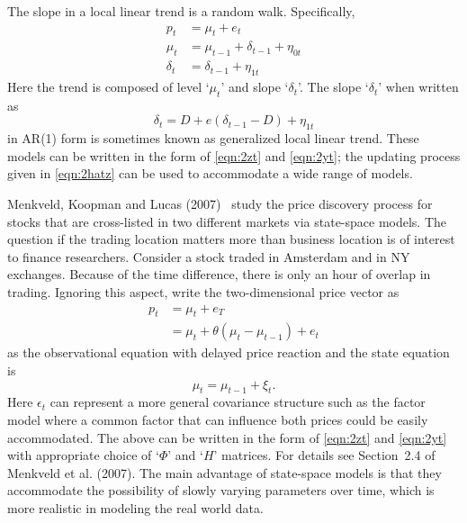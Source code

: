 \begin{ex}
The slope in a local linear trend is a random walk. Specifically,
	\begin{equation} \label{eqn:randomwalk}
	\begin{split}
	p_t&= \mu_t + e_t \\
	\mu_t&= \mu_{t-1} + \delta_{t-1} + \eta_{0t} \\
	\delta_t&= \delta_{t-1} + \eta_{1t}
	\end{split}
	\end{equation}
Here the trend is composed of level `$\mu_t$' and slope `$\delta_t$'. The slope `$\delta_t$' when written as 
	\begin{equation} \label{eqn:slopewritten}
	\delta_t= D+ e(\delta_{t-1} - D)+ \eta_{1t}
	\end{equation}
in AR(1) form is sometimes known as generalized local linear trend. These models can be written in the form of \eqref{eqn:2zt} and \eqref{eqn:2yt}; the updating process given in \eqref{eqn:2hatz} can be used to accommodate a wide range of models. \xqed
\end{ex}


\begin{ex}
Menkveld, Koopman and Lucas (2007)~\cite{menkkoop} study the price discovery process for stocks that are cross-listed in two different markets via state-space models. The question if the trading location matters more than business location is of interest to finance researchers. Consider a stock traded in Amsterdam and in NY exchanges. Because of the time difference, there is only an hour of overlap in trading. Ignoring this aspect, write the two-dimensional price vector as
	\begin{equation}
	\begin{split}
	p_t&= \mu_t + e_T \\
	&=\mu_t + \theta(\mu_t - \mu_{t-1}) + e_t
	\end{split}
	\end{equation}
as the observational equation with delayed price reaction and the state equation is
	\begin{equation}
	\mu_t= \mu_{t-1} + \xi_t.
	\end{equation}
Here $\epsilon_t$ can represent a more general covariance structure such as the factor model where a common factor that can influence both prices could be easily accommodated. The above can be written in the form of \eqref{eqn:2zt} and \eqref{eqn:2yt} with appropriate choice of `$\Phi$' and `$H$' matrices. For details see Section~2.4 of Menkveld et al. (2007)\cite{menkkoop}. The main advantage of state-space models is that they accommodate the possibility of slowly varying parameters over time, which is more realistic in modeling the real world data. \xqed
\end{ex}


